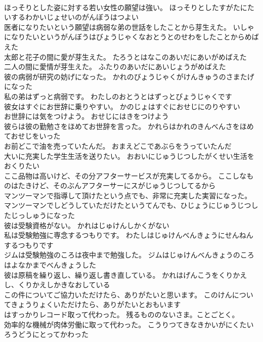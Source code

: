 \documentclass[8pt]{extreport}
\begin{document}
\begin{CJK}{UTF8}{min}
\\	ほっそりとした姿に対する若い女性の願望は強い。	ほっそりとしたすがたにたいするわかいじょせいのがんぼうはつよい 
\\	医者になりたいという願望は病弱な弟の世話をしたことから芽生えた。	いしゃになりたいというがんぼうはびょうじゃくなおとうとのせわをしたことからめばえた 
\\	太郎と花子の間に愛が芽生えた。	たろうとはなこのあいだにあいがめばえた 
\\	二人の間に愛情が芽生えた。	ふたりのあいだにあいじょうがめばえた 
\\	彼の病弱が研究の妨げになった。	かれのびょうじゃくがけんきゅうのさまたげになった 
\\	私の弟はずっと病弱です。	わたしのおとうとはずっとびょうじゃくです 
\\	彼女はすぐにお世辞に乗りやすい。	かのじょはすぐにおせじにのりやすい 
\\	お世辞には気をつけよう。	おせじにはきをつけよう 
\\	彼らは彼の勤勉さをほめてお世辞を言った。	かれらはかれのきんべんさをほめておせじをいった 
\\	お前どこで油を売っていたんだ。	おまえどこであぶらをうっていたんだ 
\\	大いに充実した学生生活を送りたい。	おおいにじゅうじつしたがくせい生活をおくりたい 
\\	ここ品物は高いけど、その分アフターサービスが充実してるから。	ここしなものはたきけど、そのぶんアフターサーにスがじゅうじつしてるから 
\\	マンツーマンで指導して頂けたという点でも、非常に充実した実習になった。	マンツーマンでしどうしていただけたというてんでも、ひじょうにじゅうじつしたじっしゅうになった 
\\	彼は受験資格がない。	かれはじゅけんしかくがない 
\\	私は受験勉強に専念するつもりです。	わたしはじゅけんべんきょうにせんねんするつもりです 
\\	ジムは受験勉強のころは夜中まで勉強した。	ジムはじゅけんべんきょうのころはよなかまでべんきょうした 
\\	彼は原稿を繰り返し、繰り返し書き直している。	かれはげんこうをくりかえし、くりかえしかきなおしている 
\\	この件についてご協力いただけたら、ありがたいと思います。	このけんについてきょうりょくいただけたら、ありがたいとおもいます 
\\	はすっかりレコード取って代わった。	残るもののないさま。ことごとく。
\\	効率的な機械が肉体労働に取って代わった。	こうりつてきなきかいがにくたいろうどうにとってかわった 

\end{CJK}
\end{document}
